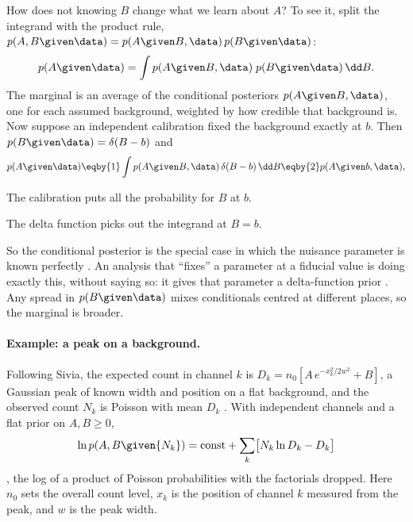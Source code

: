 How does not knowing $B$ change what we learn about $A$? To see it, split the integrand
with the product rule, $p(A,B\given\data)=p(A\given B,\data)\,p(B\given\data)$:
\begin{equation}
  p(A\given\data)=\int p(A\given B,\data)\;p(B\given\data)\,\dd B .
  \label{5b:eq:marg-mix}
\end{equation}
The marginal is an average of the conditional posteriors $p(A\given B,\data)$, one for
each assumed background, weighted by how credible that background is. Now suppose an
independent calibration fixed the background exactly at $b$. Then $p(B\given\data)=
\delta(B-b)$ and
\begin{align*}
  p(A\given\data)
  \eqby{1}\int p(A\given B,\data)\,\delta(B-b)\,\dd B
  \eqby{2}p(A\given b,\data),
\end{align*}
\begin{explain}
  \item The calibration puts all the probability for $B$ at $b$.
  \item The delta function picks out the integrand at $B=b$.
\end{explain}
So the conditional posterior is the special case in which the nuisance parameter is
known perfectly . An analysis that ``fixes'' a parameter at a
fiducial value is doing exactly this, without saying so: it gives that parameter a
delta-function prior . Any spread in $p(B\given\data)$ mixes
conditionals centred at different places, so the marginal is broader.

\paragraph{Example: a peak on a background.}
Following Sivia, the expected count in channel $k$ is $D_k=n_0[A\,e^{-x_k^2/2w^2}+B]$,
a Gaussian peak of known width and position on a flat background, and the observed count
$N_k$ is Poisson with mean $D_k$ . With independent channels
and a flat prior on $A,B\ge0$,
\begin{equation*}
  \ln p(A,B\given\{N_k\})=\text{const}+\sum_k\bigl[N_k\ln D_k-D_k\bigr]
\end{equation*}
, the log of a product of Poisson probabilities with the factorials
dropped. Here $n_0$ sets the overall count level, $x_k$ is the position of channel $k$
measured from the peak, and $w$ is the peak width.

